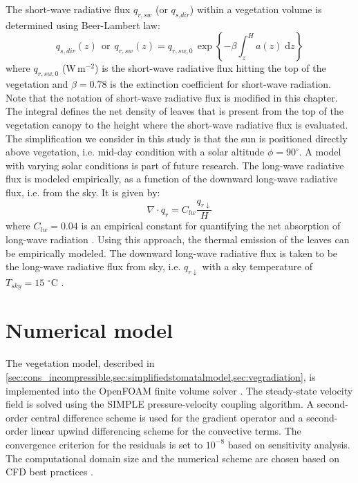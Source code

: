 The short-wave radiative flux $q_{\mathit{r,sw}}$ (or $q_{\textit{s,dir}}$) within a vegetation volume is determined using Beer-Lambert law:
\begin{equation}
q_{s,dir}(z) ~~\mathrm{or}~~  {q_{r,sw}}(z) = {q_{r,sw,0}}\,{\exp}\left\{ - \beta \int_z^H {a\left( z \right)} \;\mathrm{d}z \right\}
\label{eq:beerlambert}
\end{equation}
where $q_{r,sw,0}$ (W\,m$^{-2}$) is the short-wave radiative flux hitting the top of the vegetation and $\beta=0.78$ is the extinction coefficient for short-wave radiation. Note that the notation of short-wave radiative flux is modified in this chapter. The integral defines the net density of leaves that is present from the top of the vegetation canopy to the height where the short-wave radiative flux is evaluated. The simplification we consider in this study is that the sun is positioned directly above vegetation, i.e. mid-day condition with a solar altitude $\phi=90^{\circ}$. A model with varying solar conditions is part of future research. The long-wave radiative flux is modeled empirically, as a function of the downward long-wave radiative flux, i.e. from the sky. It is given by:
\begin{equation}
\nabla  \cdot {q_{\mathit{r}}} = {C_{\mathit{lw}}}\frac{{{q_{\mathit{r} \downarrow }}}}{H}
\end{equation}
where $C_{lw}=0.04$ is an empirical constant for quantifying the net absorption of long-wave radiation \citep{Kichah2012}. Using this approach, the thermal emission of the leaves can be empirically modeled. The downward long-wave radiative flux is taken to be the long-wave radiative flux from sky, i.e. ${q_{\mathit{r} \downarrow }}$ with a sky temperature of $T_{\mathit{sky}}=15$ $^{\circ}$C \citep{Saneinejad2014}.

\section{Numerical model}
\label{sec:nummodel}

The vegetation model, described in \cref{sec:cons_incompressible,sec:simplifiedstomatalmodel,sec:vegradiation}, is implemented into the OpenFOAM finite volume solver \citep{Weller1998a}. The steady-state velocity field is solved using the SIMPLE pressure-velocity coupling algorithm. A second-order central difference scheme is used for the gradient operator and a second-order linear upwind differencing scheme for the convective terms. The convergence criterion for the residuals is set to $10^{-8}$ based on sensitivity analysis. The computational domain size and the numerical scheme are chosen based on CFD best practices \citep{Blocken2015, Franke2007, Tominaga2008}.

